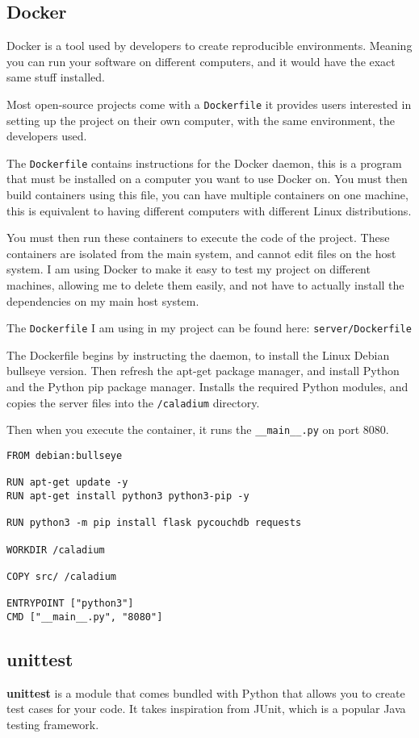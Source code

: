 \subsection{Docker}
Docker is a tool used by developers to create reproducible environments.
Meaning you can run your software on different computers,
and it would have the exact same stuff installed.

Most open-source projects come with a \texttt{Dockerfile} it provides
users interested in setting up the project on their own computer,
with the same environment, the developers used.

The \texttt{Dockerfile} contains instructions for the Docker daemon,
this is a program that must be installed
on a computer you want to use Docker on.
You must then build containers using this file,
you can have multiple containers on one machine,
this is equivalent to having different computers with different Linux distributions.

You must then run these containers to
execute the code of the project.
These containers are isolated from the main system,
and cannot edit files on the host system.
I am using Docker to make it easy to test my project on different machines,
allowing me to delete them easily,
and not have to actually install the dependencies on my main host system.

The \texttt{Dockerfile} I am using in my project can be found here:
\texttt{server/Dockerfile}

The Dockerfile begins by instructing the daemon,
to install the Linux Debian bullseye version.
Then refresh the apt-get package manager,
and install Python and the Python pip package manager.
Installs the required Python modules,
and copies the server files into the \texttt{/caladium} directory.

Then when you execute the container,
it runs the \texttt{\_\_main\_\_.py} on port 8080.

\begin{lstlisting}
FROM debian:bullseye

RUN apt-get update -y
RUN apt-get install python3 python3-pip -y

RUN python3 -m pip install flask pycouchdb requests

WORKDIR /caladium

COPY src/ /caladium

ENTRYPOINT ["python3"]
CMD ["__main__.py", "8080"]
\end{lstlisting}

\subsection{unittest}
\textbf{unittest} is a module that comes bundled with Python
that allows you to create test cases for your code. \cite{unittest}
It takes inspiration from JUnit, which is a popular Java testing framework.


